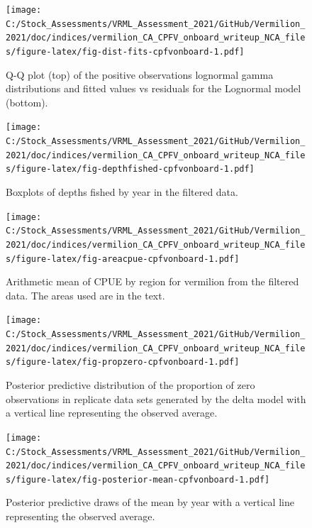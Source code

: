 \documentclass[
  english,
  a4paper,
]{article}
\begin{document}
\FloatBarrier

\begin{figure}
\centering
\texttt{[image: C:/Stock\_Assessments/VRML\_Assessment\_2021/GitHub/Vermilion\_2021/doc/indices/vermilion\_CA\_CPFV\_onboard\_writeup\_NCA\_files/figure-latex/fig-dist-fits-cpfvonboard-1.pdf]}
\caption{\label{fig:fig-dist-fits-cpfvonboard}Q-Q plot (top) of the positive observations lognormal gamma distributions and fitted values vs residuals for the Lognormal model (bottom).}
\end{figure}

\begin{figure}
\centering
\texttt{[image: C:/Stock\_Assessments/VRML\_Assessment\_2021/GitHub/Vermilion\_2021/doc/indices/vermilion\_CA\_CPFV\_onboard\_writeup\_NCA\_files/figure-latex/fig-depthfished-cpfvonboard-1.pdf]}
\caption{\label{fig:fig-depthfished-cpfvonboard}Boxplots of depths fished by year in the filtered data.}
\end{figure}

\begin{figure}
\centering
\texttt{[image: C:/Stock\_Assessments/VRML\_Assessment\_2021/GitHub/Vermilion\_2021/doc/indices/vermilion\_CA\_CPFV\_onboard\_writeup\_NCA\_files/figure-latex/fig-areacpue-cpfvonboard-1.pdf]}
\caption{\label{fig:fig-areacpue-cpfvonboard}Arithmetic mean of CPUE by region for vermilion from the filtered data. The areas used are in the text.}
\end{figure}

\begin{figure}
\centering
\texttt{[image: C:/Stock\_Assessments/VRML\_Assessment\_2021/GitHub/Vermilion\_2021/doc/indices/vermilion\_CA\_CPFV\_onboard\_writeup\_NCA\_files/figure-latex/fig-propzero-cpfvonboard-1.pdf]}
\caption{\label{fig:fig-propzero-cpfvonboard}Posterior predictive distribution of the proportion of zero observations in replicate data sets generated by the delta model with a vertical line representing the observed average.}
\end{figure}

\begin{figure}
\centering
\texttt{[image: C:/Stock\_Assessments/VRML\_Assessment\_2021/GitHub/Vermilion\_2021/doc/indices/vermilion\_CA\_CPFV\_onboard\_writeup\_NCA\_files/figure-latex/fig-posterior-mean-cpfvonboard-1.pdf]}
\caption{\label{fig:fig-posterior-mean-cpfvonboard}Posterior predictive draws of the mean by year with a vertical line representing the observed average.}
\end{figure}
\end{document}
